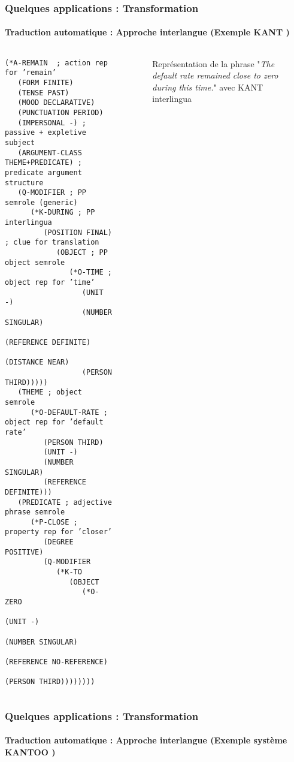 \documentclass[xcolor=table]{beamer}
\begin{document}
\begin{frame}[fragile]
	\frametitle{Quelques applications : Transformation}
	\framesubtitle{Traduction automatique : Approche interlangue (Exemple KANT \cite{98-czuba-al})}
\begin{columns}
\begin{column}{0.5\textwidth}
\fontsize{4}{5}\selectfont\bfseries
\begin{verbatim}
(*A-REMAIN  ; action rep for ’remain’
   (FORM FINITE)
   (TENSE PAST)
   (MOOD DECLARATIVE)
   (PUNCTUATION PERIOD)
   (IMPERSONAL -) ; passive + expletive subject
   (ARGUMENT-CLASS THEME+PREDICATE) ; predicate argument structure
   (Q-MODIFIER ; PP semrole (generic)
      (*K-DURING ; PP interlingua
         (POSITION FINAL) ; clue for translation
            (OBJECT ; PP object semrole
               (*O-TIME ; object rep for ’time’
                  (UNIT -)
                  (NUMBER SINGULAR)
                  (REFERENCE DEFINITE)
                  (DISTANCE NEAR)
                  (PERSON THIRD)))))
   (THEME ; object semrole
      (*O-DEFAULT-RATE ; object rep for ’default rate’
         (PERSON THIRD)
         (UNIT -)
         (NUMBER SINGULAR)
         (REFERENCE DEFINITE)))
   (PREDICATE ; adjective phrase semrole
      (*P-CLOSE ; property rep for ’closer’
         (DEGREE POSITIVE)
         (Q-MODIFIER
            (*K-TO
               (OBJECT
                  (*O-ZERO
                     (UNIT -)
                     (NUMBER SINGULAR)
                     (REFERENCE NO-REFERENCE)
                     (PERSON THIRD))))))))
\end{verbatim}
\end{column}
\begin{column}{0.5\textwidth}
	\begin{figure}
		\caption{Représentation de la phrase "\textit{The default rate remained close to zero during this time.}" avec KANT interlingua \cite{98-czuba-al}}
	\end{figure}
\end{column}
\end{columns}


\end{frame}

\begin{frame}[fragile]
	\frametitle{Quelques applications : Transformation}
	\framesubtitle{Traduction automatique : Approche interlangue (Exemple système KANTOO \cite{00-nyberg-al})}
	
	
\end{frame}
\end{document}
